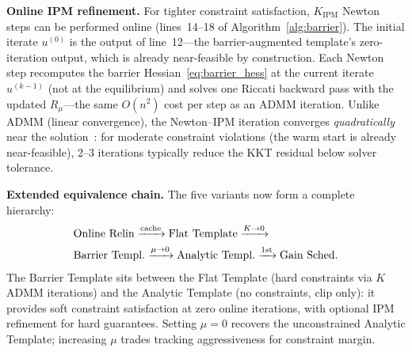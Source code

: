 \textbf{Online IPM refinement.}
For tighter constraint satisfaction, $K_{\mathrm{IPM}}$
Newton steps can be performed online
(lines~14--18 of Algorithm~\ref{alg:barrier}).
The initial iterate $u^{(0)}$ is the output of line~12---the
barrier-augmented template's zero-iteration output, which is
already near-feasible by construction.
Each Newton step recomputes the barrier
Hessian~\eqref{eq:barrier_hess} at the current iterate
$u^{(k-1)}$ (not at the equilibrium) and solves one Riccati
backward pass with the updated $R_\mu$---the same
$O(n^2)$ cost per step as an ADMM iteration.
Unlike ADMM (linear convergence), the Newton--IPM iteration
converges \emph{quadratically} near the
solution~\cite{boyd2004,jordana2023}: for moderate constraint
violations (the warm start is already near-feasible),
2--3 iterations typically reduce the KKT residual
below solver tolerance.

\textbf{Extended equivalence chain.}
The five variants now form a complete hierarchy:
\begin{align}\label{eq:full_chain}
  &\text{Online Relin}
  \xrightarrow{\text{cache}}
  \text{Flat Template}
  \xrightarrow{K\to 0} \notag \\
  &\text{Barrier Templ.}
  \xrightarrow{\mu\to 0}
  \text{Analytic Templ.}
  \xrightarrow{\text{1st}}
  \text{Gain Sched.}
\end{align}
The Barrier Template sits between the Flat Template
(hard constraints via $K$ ADMM iterations) and the
Analytic Template (no constraints, clip only):
it provides soft constraint satisfaction at zero online
iterations, with optional IPM refinement for hard guarantees.
Setting $\mu = 0$ recovers the unconstrained Analytic
Template; increasing $\mu$ trades tracking aggressiveness
for constraint margin.
